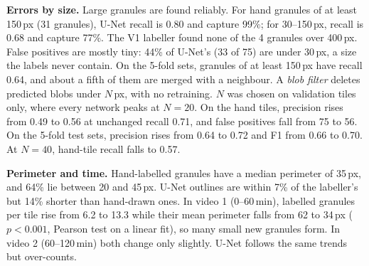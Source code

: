 \documentclass[conference]{IEEEtran}
\begin{document}
\textbf{Errors by size.} Large granules are found reliably. For hand
granules of at least 150\,px (31 granules), U-Net recall is 0.80 and capture
99\%; for 30--150\,px, recall is 0.68 and capture 77\%. The V1 labeller
found none of the 4 granules over 400\,px. False positives are mostly tiny:
44\% of U-Net's (33 of 75) are under 30\,px, a size the labels never contain.
On the 5-fold sets, granules of at least 150\,px have recall 0.64, and about
a fifth of them are merged with a neighbour. A \emph{blob filter} deletes
predicted blobs under $N$\,px, with no retraining. $N$ was chosen on
validation tiles only, where every network peaks at $N=20$. On the hand
tiles, precision rises from 0.49 to 0.56 at unchanged recall 0.71, and false
positives fall from 75 to 56. On the 5-fold test sets, precision rises from
0.64 to 0.72 and F1 from 0.66 to 0.70. At $N=40$, hand-tile recall falls to
0.57.

\textbf{Perimeter and time.} Hand-labelled granules have a median perimeter
of 35\,px, and 64\% lie between 20 and 45\,px. U-Net outlines are within 7\%
of the labeller's but 14\% shorter than hand-drawn ones. In video 1
(0--60\,min), labelled granules per tile rise from 6.2 to 13.3 while their
mean perimeter falls from 62 to 34\,px ($p<0.001$, Pearson test on a linear
fit), so many small new granules form. In video 2 (60--120\,min) both
change only slightly. U-Net follows the same trends but over-counts.
\end{document}
